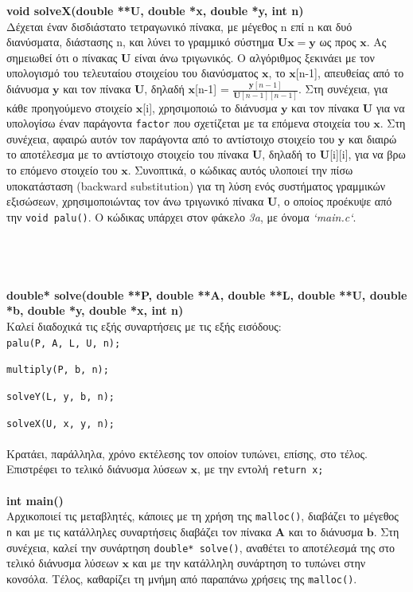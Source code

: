 \documentclass[a4paper, 14pt]{article}   %
\begin{document}
\textbf{void solveX(double **U, double *x, double *y, int n)}\\
Δέχεται έναν δισδιάστατο τετραγωνικό πίνακα, με μέγεθος n επί n και δυό διανύσματα, διάστασης n, και λύνει το γραμμικό σύστημα $\mathbf{Ux = y}$ ως προς $\mathbf{x}$. Ας σημειωθεί ότι ο πίνακας $\mathbf{U}$ είναι άνω τριγωνικός. Ο αλγόριθμος ξεκινάει με τον υπολογισμό του τελευταίου στοιχείου του διανύσματος $\mathbf{x}$, το $\mathbf{x}$[n-1], απευθείας από το διάνυσμα $\mathbf{y}$ και τον πίνακα $\mathbf{U}$, δηλαδή $\mathbf{x}$[n-1] = $\frac{\mathbf{y}[n-1]}{\mathbf{U}[n-1][n-1]}$. Στη συνέχεια, για κάθε προηγούμενο στοιχείο $\mathbf{x}$[i], χρησιμοποιώ το διάνυσμα $\mathbf{y}$ και τον πίνακα $\mathbf{U}$ για να υπολογίσω έναν παράγοντα \texttt {factor} που σχετίζεται με τα επόμενα στοιχεία του $\mathbf{x}$. Στη συνέχεια, αφαιρώ αυτόν τον παράγοντα από το αντίστοιχο στοιχείο του $\mathbf{y}$ και διαιρώ το αποτέλεσμα με το αντίστοιχο στοιχείο του πίνακα $\mathbf{U}$, δηλαδή το $\mathbf{U}$[i][i], για να βρω το επόμενο στοιχείο του $\mathbf{x}$. Συνοπτικά, ο κώδικας αυτός υλοποιεί την πίσω υποκατάσταση (backward substitution) για τη λύση ενός συστήματος γραμμικών εξισώσεων, χρησιμοποιώντας τον άνω τριγωνικό πίνακα $\mathbf{U}$, ο οποίος προέκυψε από την \texttt{void palu()}. Ο κώδικας υπάρχει στον φάκελο \emph{3a}, με όνομα \emph{`main.c`}.\\\\\\\\\\
\textbf{double* solve(double **P, double **A, double **L, double **U, double *b, double *y, double *x, int n)}\\
Καλεί διαδοχικά τις εξής συναρτήσεις με τις εξής εισόδους:\\

	\texttt{palu(P, A, L, U, n);}

	\texttt{multiply(P, b, n);}

	\texttt{solveY(L, y, b, n);}

	\texttt{solveX(U, x, y, n);}\\\\
Κρατάει, παράλληλα, χρόνο εκτέλεσης τον οποίον τυπώνει, επίσης, στο τέλος. Επιστρέφει το τελικό διάνυσμα λύσεων $\mathbf{x}$, με την εντολή \texttt{return x;}\\\\
\textbf{int main()}\\
Αρχικοποιεί τις μεταβλητές, κάποιες με τη χρήση της \texttt{malloc()}, διαβάζει το μέγεθος \texttt{n} και με τις κατάλληλες συναρτήσεις διαβάζει τον πίνακα $\mathbf{A}$ και το διάνυσμα $\mathbf{b}$. Στη συνέχεια, καλεί την συνάρτηση \texttt{double* solve()}, αναθέτει το αποτέλεσμά της στο τελικό διάνυσμα λύσεων $\mathbf{x}$ και με την κατάλληλη συνάρτηση το τυπώνει στην κονσόλα. Τέλος, καθαρίζει τη μνήμη από παραπάνω χρήσεις της \texttt{malloc()}.\\
\end{document}
